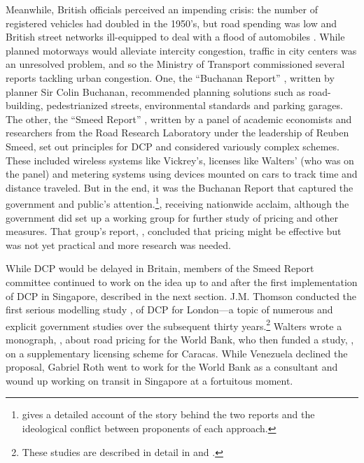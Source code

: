 Meanwhile, British officials perceived an impending crisis: the number of registered vehicles had doubled in the 1950's, but road spending was low and British street networks ill-equipped to deal with a flood of automobiles \citep{Gunn2011,Hall2004}. While planned motorways would alleviate intercity congestion, traffic in city centers was an unresolved problem, and so the Ministry of Transport commissioned several reports tackling urban congestion. One, the ``Buchanan Report'' \citep{MoT1963}, written by planner Sir Colin Buchanan, recommended planning solutions such as road-building, pedestrianized streets, environmental standards and parking garages. The other, the ``Smeed Report'' \citep{MoT1964}, written by a panel of academic economists and researchers from the Road Research Laboratory under the leadership of Reuben Smeed, set out principles for DCP and considered variously complex schemes. These included wireless systems like Vickrey's, licenses like Walters' (who was on the panel) and metering systems using devices mounted on cars to track time and distance traveled. But in the end, it was the Buchanan Report that captured the government and public's attention.\footnote{\citet{Rooney2014} gives a detailed account of the story behind the two reports and the ideological conflict between proponents of each approach.}, receiving nationwide acclaim, although the government did set up a working group for further study of pricing and other measures.  That group's report, \citet{MoT1967}, concluded that pricing might be effective but was not yet practical and more research was needed.

While DCP would be delayed in Britain, members of the Smeed Report committee continued to work on the idea up to and after the first implementation of DCP in Singapore, described in the next section. J.M. Thomson conducted the first serious modelling study \citep{Thomson1967a}, of DCP for London---a topic of numerous and explicit government studies over the subsequent thirty years.\footnote{These studies are described in detail in \citet[Ch. 4]{Richards2006} and \citet[Ch. 4]{Gomez-Ibanez1994}.} Walters wrote a monograph, \citet{Walters1968}, about road pricing for the World Bank, who then funded a study, \citet{Vorhees1973}, on a supplementary licensing scheme for Caracas. While Venezuela declined the proposal, Gabriel Roth went to work for the World Bank as a consultant and wound up working on transit in Singapore at a fortuitous moment.
